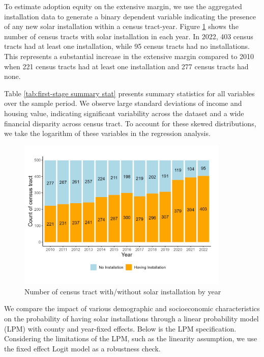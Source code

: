 \documentclass[11pt,twoside,letterpaper]{article}
\begin{document}
To estimate adoption equity on the extensive margin, we use the aggregated installation data to generate a binary dependent variable indicating the presence of any new solar installation within a census tract-year. Figure \ref{fig:stack_installation} shows the number of census tracts with solar installation in each year. In 2022, 403 census tracts had at least one installation, while 95 census tracts had no installations. This represents a substantial increase in the extensive margin compared to 2010 when 221 census tracts had at least one installation and 277 census tracts had none.

Table \ref{tab:first-stage summary stat} presents summary statistics for all variables over the sample period. We observe large standard deviations of income and housing value, indicating significant variability across the dataset and a wide financial disparity across census tract. To account for these skewed distributions, we take the logarithm of these variables in the regression analysis. 

\begin{figure}[!ht]
    \centering
\includegraphics[width=0.9\textwidth]{figures/stack_installation.png}
    \caption{Number of census tract with/without solar installation by year}
    \label{fig:stack_installation}
\end{figure}

We compare the impact of various demographic and socioeconomic characteristics on the probability of having solar installations through a linear probability model (LPM) with county and year-fixed effects. Below is the LPM specification. Considering the limitations of the LPM, such as the linearity assumption, we use the fixed effect Logit model as a robustness check.
\end{document}
